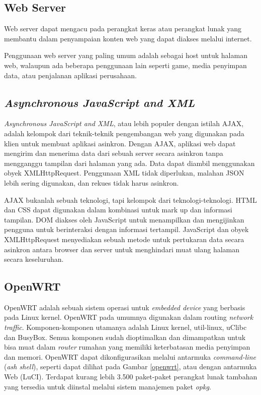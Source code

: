   \subsection{Web Server}
    Web server dapat mengacu pada perangkat keras atau perangkat lunak yang membantu dalam penyampaian konten web yang dapat diakses melalui internet.

    Penggunaan web server yang paling umum adalah sebagai host untuk halaman web, walaupun ada beberapa penggunaan lain seperti game, media penyimpan data, atau penjalanan aplikasi perusahaan.


  \subsection{\emph{Asynchronous JavaScript and XML}}
    \emph{Asynchronous JavaScript and XML}, atau lebih populer dengan istilah AJAX, adalah kelompok dari teknik-teknik pengembangan web yang digunakan pada klien untuk membuat aplikasi asinkron. Dengan AJAX, aplikasi web dapat mengirim dan menerima data dari sebuah server secara asinkron tanpa mengganggu tampilan dari halaman yang ada. Data dapat diambil menggunakan obyek XMLHttpRequest. Penggunaan XML tidak diperlukan, malahan JSON lebih sering digunakan, dan rekues tidak harus asinkron.

    AJAX bukanlah sebuah teknologi, tapi kelompok dari teknologi-teknologi. HTML dan CSS dapat digunakan dalam kombinasi untuk mark up dan informasi tampilan. DOM diakses oleh JavaScript untuk menampilkan dan mengijinkan pengguna untuk berinteraksi dengan informasi tertampil. JavaScript dan obyek XMLHttpRequest menyediakan sebuah metode untuk pertukaran data secara asinkron antara browser dan server untuk menghindari muat ulang halaman secara keseluruhan.


  \subsection{OpenWRT}
    OpenWRT adalah sebuah sistem operasi untuk \emph{embedded device} yang berbasis pada Linux kernel. OpenWRT pada umumnya digunakan dalam routing \emph{network traffic}. Komponen-komponen utamanya adalah Linux kernel, util-linux, uClibc dan BusyBox. Semua komponen sudah dioptimalkan dan dimampatkan untuk bisa muat dalam \emph{router} rumahan yang memiliki keterbatasan media penyimpan dan memori. OpenWRT dapat dikonfigurasikan melalui antarmuka \emph{command-line} (\emph{ash shell}), seperti dapat dilihat pada Gambar \ref{openwrt}, atau dengan antarmuka Web (LuCI). Terdapat kurang lebih 3.500 paket-paket perangkat lunak tambahan yang tersedia untuk diinstal melalui sistem manajemen paket \emph{opkg}.

